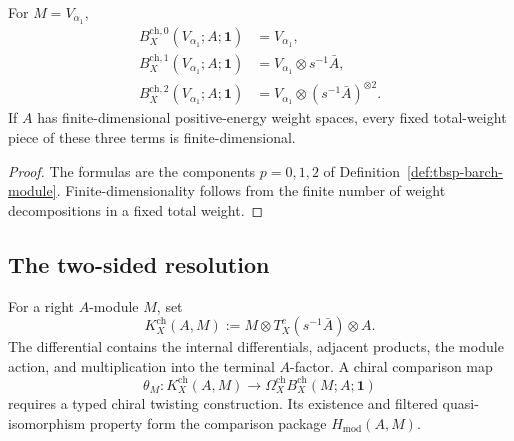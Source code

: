 \begin{lemma}
\label{lem:tbsp-bar-valpha1-first-terms}
For \(M=V_{\alpha_1}\),
\begin{align}
 B_X^{\mathrm{ch},0}(V_{\alpha_1};A;\mathbf1)
 &=V_{\alpha_1},
 \label{eq:tbsp-bar-valpha1-deg0}\\
 B_X^{\mathrm{ch},1}(V_{\alpha_1};A;\mathbf1)
 &=V_{\alpha_1}\otimes s^{-1}\bar A,
 \label{eq:tbsp-bar-valpha1-deg1}\\
 B_X^{\mathrm{ch},2}(V_{\alpha_1};A;\mathbf1)
 &=V_{\alpha_1}\otimes(s^{-1}\bar A)^{\otimes2}.
 \label{eq:tbsp-bar-valpha1-deg2}
\end{align}
If \(A\) has finite-dimensional positive-energy weight spaces, every
fixed total-weight piece of these three terms is finite-dimensional.
\end{lemma}

\begin{proof}
The formulas are the components \(p=0,1,2\) of
Definition~\ref{def:tbsp-barch-module}.  Finite-dimensionality follows
from the finite number of weight decompositions in a fixed total
weight.
\end{proof}

\subsection{The two-sided resolution}
\label{subsec:tbsp-omegabar-valpha1}

\begin{definition}
\label{def:tbsp-omegabar-module}
For a right \(A\)-module \(M\), set
\begin{equation}\label{eq:tbsp-two-sided-model}
 K_X^{\mathrm{ch}}(A,M)
 :=
 M\otimes T_X^c(s^{-1}\bar A)\otimes A .
\end{equation}
The differential contains the internal differentials, adjacent
products, the module action, and multiplication into the terminal
\(A\)-factor.  A chiral comparison map
\begin{equation}\label{eq:tbsp-two-sided-comparison}
 \theta_M\colon
 K_X^{\mathrm{ch}}(A,M)
 \longrightarrow
 \Omega_X^{\mathrm{ch}}B_X^{\mathrm{ch}}(M;A;\mathbf1)
\end{equation}
requires a typed chiral twisting construction.  Its existence and
filtered quasi-isomorphism property form the comparison package
\(H_{\mathrm{mod}}(A,M)\).
\end{definition}

